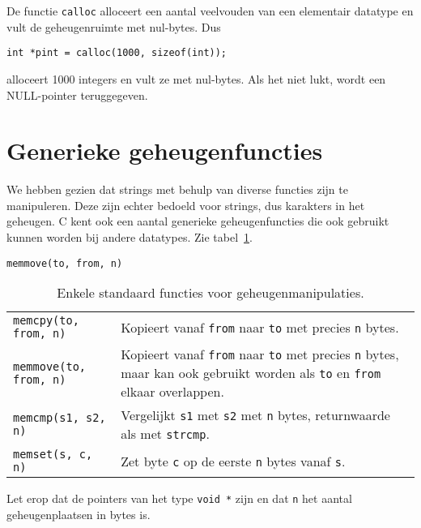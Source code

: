 De functie \texttt{calloc} alloceert een aantal veelvouden van een elementair datatype en vult de geheugenruimte met nul-bytes. Dus

\hspace*{1em}\texttt{int *pint = calloc(1000, sizeof(int));}

alloceert 1000 integers en vult ze met nul-bytes. Als het niet lukt, wordt een NULL-pointer teruggegeven.


\section{Generieke geheugenfuncties}
We hebben gezien dat strings met behulp van diverse functies zijn te manipuleren. Deze zijn echter bedoeld voor strings, dus karakters in het geheugen. C kent ook een aantal generieke geheugenfuncties die ook gebruikt kunnen worden bij andere datatypes. Zie tabel~\ref{tab:arymemmanip}.

\hbox{\texttt{memmove(to, from, n)}}
\begin{table}[!ht]
\centering
\caption{Enkele standaard functies voor geheugenmanipulaties.}
\label{tab:arymemmanip}
\begin{tabular}{@{}p{}p{10cm}@{}}
\toprule
\texttt{memcpy(to, from, n)} &  Kopieert vanaf \texttt{from} naar \texttt{to} met precies \texttt{n} bytes.\\
\texttt{memmove(to, from, n)} &  Kopieert vanaf \texttt{from} naar \texttt{to} met precies \texttt{n} bytes, maar kan ook gebruikt worden als \texttt{to} en \texttt{from} elkaar overlappen.\\
\texttt{memcmp(s1, s2, n)} &  Vergelijkt \texttt{s1} met \texttt{s2} met \texttt{n} bytes, returnwaarde als met \texttt{strcmp}.\\
\texttt{memset(s, c, n)} & Zet byte \texttt{c} op de eerste \texttt{n} bytes vanaf \texttt{s}.\\
\bottomrule
\end{tabular} 
\end{table}

Let erop dat de pointers van het type \texttt{void *} zijn en dat \texttt{n} het aantal geheugenplaatsen in bytes is.


\advanced
